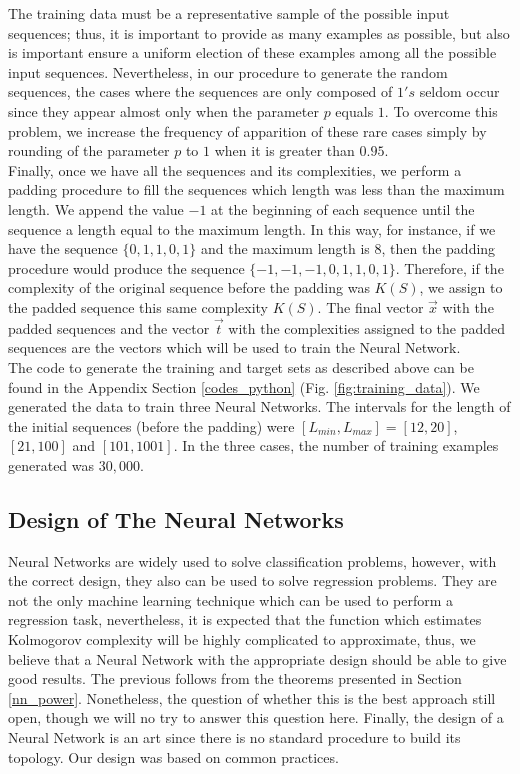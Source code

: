 The training data must be a representative sample of the possible input sequences; thus, it is important to provide as many examples as possible, but also is important ensure a uniform election of these examples among all the possible input sequences. Nevertheless, in our procedure to generate the random sequences, the cases where the sequences are only composed of $1's$ seldom occur since they appear almost only when the parameter $p$ equals $1$. To overcome this problem, we increase the frequency of apparition of these rare cases simply by rounding of the parameter $p$ to $1$ when it is greater than $0.95$.\\

Finally, once we have all the sequences and its complexities, we perform a padding procedure to fill the sequences which length was less than the maximum length. We append the value $-1$ at the beginning of each sequence until the sequence a length equal to the maximum length. In this way, for instance, if we have the sequence $\{0,1,1,0,1\}$ and the maximum length is $8$, then the padding procedure would produce the sequence $\{-1,-1,-1,0,1,1,0,1\}$. Therefore, if the complexity of the original sequence before the padding was $K(S)$, we assign to the padded sequence this same complexity $K(S)$. The final vector $\vec{x}$ with the padded sequences and the vector $\vec{t}$ with the complexities assigned to the padded sequences are the vectors which will be used to train the Neural Network.\\

The code to generate the training and target sets as described above can be found in the Appendix Section \ref{codes_python} (Fig. \ref{fig:training_data}). We generated the data to train three Neural Networks. The intervals for the length of the initial sequences (before the padding) were $[L_{min},L_{max}]=[12,20]$,$[21,100]$ and $[101,1001]$. In the three cases, the number of training examples generated was $30,000$.

\subsection{Design of The Neural Networks}
Neural Networks are widely used to solve classification problems, however, with the correct design, they also can be used to solve regression problems. They are not the only machine learning technique which can be used to perform a regression task, nevertheless, it is expected that the function which estimates Kolmogorov complexity will be highly complicated to approximate, thus, we believe that a Neural Network with the appropriate design should be able to give good results. The previous follows from the theorems presented in Section \ref{nn_power}. Nonetheless, the question of whether this is the best approach still open, though we will no try to answer this question here. Finally, the design of a Neural Network is an art since there is no standard procedure to build its topology. Our design was based on common practices.\\

